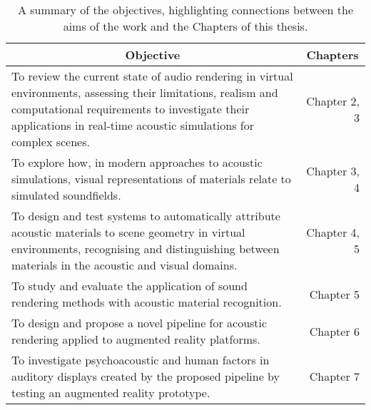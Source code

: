 \begin{table}[tbp]
  \centering
  \caption{A summary of the objectives, highlighting connections between the aims of the work and the Chapters of this thesis.}\label{tab:objectives-contributions}
    \begin{tabularx}{\linewidth}{Xr}
    \toprule
    \multicolumn{1}{c}{Objective} & \multicolumn{1}{c}{Chapters} \\ \midrule
    To review the current state of audio rendering in virtual environments, assessing their limitations, realism and computational requirements to  investigate their applications in real-time acoustic simulations for complex scenes.\newline &  Chapter 2, 3 \\
    To explore how, in modern approaches to acoustic simulations, visual representations of materials relate to simulated soundfields.\newline & Chapter 3, 4 \\
    To design and test systems to automatically attribute acoustic materials to scene geometry in virtual environments, recognising and distinguishing between materials in the acoustic and visual domains.\newline & Chapter 4, 5 \\
    To study and evaluate the application of sound rendering methods with acoustic material recognition.\newline & Chapter 5 \\
    To design and propose a novel pipeline for acoustic rendering applied to augmented reality platforms.\newline & Chapter 6 \\
    To investigate psychoacoustic and human factors in auditory displays created by the proposed pipeline by testing an augmented reality prototype.\newline & Chapter 7 \\ \bottomrule
    \end{tabularx}
\end{table}